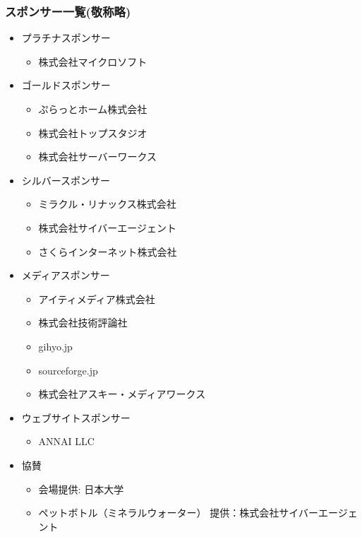 \documentclass[mingoth,a4paper,twoside]{jsarticle}
\begin{document}
\subsubsection*{スポンサー一覧(敬称略)}

\begin{itemize}
\item プラチナスポンサー
  \begin{itemize}
  \item 株式会社マイクロソフト
  \end{itemize}
\item ゴールドスポンサー
  \begin{itemize}
  \item ぷらっとホーム株式会社
  \item 株式会社トップスタジオ
  \item 株式会社サーバーワークス
  \end{itemize}
\item シルバースポンサー
  \begin{itemize}
  \item ミラクル・リナックス株式会社
  \item 株式会社サイバーエージェント
  \item さくらインターネット株式会社
  \end{itemize}
\item メディアスポンサー
  \begin{itemize}
  \item アイティメディア株式会社
  \item 株式会社技術評論社
  \item gihyo.jp
  \item sourceforge.jp
  \item 株式会社アスキー・メディアワークス
  \end{itemize}
\item ウェブサイトスポンサー
  \begin{itemize}
  \item ANNAI LLC
  \end{itemize}
\item 協賛
  \begin{itemize}
  \item 会場提供: 日本大学
  \item ペットボトル（ミネラルウォーター） 提供：株式会社サイバーエージェント
  \end{itemize}
\end{itemize}


\pagebreak
\label{sec:debhelper}
\end{document}

